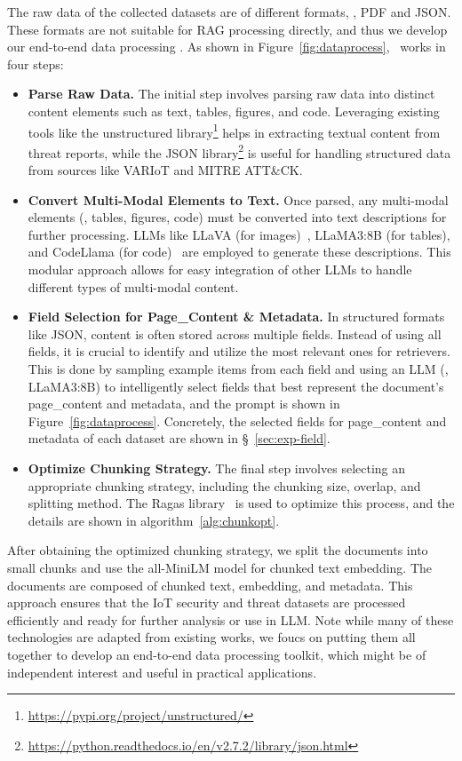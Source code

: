 The raw data of the collected datasets are of different formats, \eg, PDF and JSON. These formats are not suitable for RAG processing directly, and thus we develop our end-to-end data processing \datakit. As shown in Figure~\ref{fig:dataprocess}, \datakit\ works in four steps:
\begin{itemize}
    \item[\ding{172}] \textbf{Parse Raw Data.} The initial step involves parsing raw data into distinct content elements such as text, tables, figures, and code. Leveraging existing tools like the unstructured library\footnote{\scriptsize \url{https://pypi.org/project/unstructured/}} helps in extracting textual content from threat reports, while the JSON library\footnote{\scriptsize \url{https://python.readthedocs.io/en/v2.7.2/library/json.html}} is useful for handling structured data from sources like VARIoT and MITRE ATT\&CK.
    
    \item[\ding{173}] \textbf{Convert Multi-Modal Elements to Text.} Once parsed, any multi-modal elements (\eg, tables, figures, code) must be converted into text descriptions for further processing. LLMs like LLaVA (for images)~\cite{liu2023llava,liu2023improvedllava,liu2024llavanext}, LLaMA3:8B (for tables), and CodeLlama (for code)~\cite{roziere2023code} are employed to generate these descriptions. This modular approach allows for easy integration of other LLMs to handle different types of multi-modal content.

    \item[\ding{174}] \textbf{Field Selection for Page\_Content \& Metadata.} In structured formats like JSON, content is often stored across multiple fields.
    Instead of using all fields, it is crucial to identify and utilize the most relevant ones for retrievers. This is done by sampling example items from each field and using an LLM (\eg, LLaMA3:8B) to intelligently select fields that best represent the document's page\_content and metadata, and the prompt is shown in Figure~\ref{fig:dataprocess}.
    Concretely, the selected fields for page\_content and metadata of each dataset are shown in \S~\ref{sec:exp-field}.

    \item[\ding{175}] \textbf{Optimize Chunking Strategy.} The final step involves selecting an appropriate chunking strategy, including the chunking size, overlap, and splitting method. The Ragas library~\cite{es2023ragas} is used to optimize this process, and the details are shown in algorithm~\ref{alg:chunkopt}.
\end{itemize}



After obtaining the optimized chunking strategy, we split the documents into small chunks and use the all-MiniLM model for chunked text embedding. 
The documents are composed of chunked text, embedding, and metadata.
This approach ensures that the IoT security and threat datasets are processed efficiently and ready for further analysis or use in LLM. 
Note while many of these technologies are adapted from existing works, we foucs on putting them all together to develop an end-to-end data processing toolkit, which might be of independent interest and useful in practical applications.
